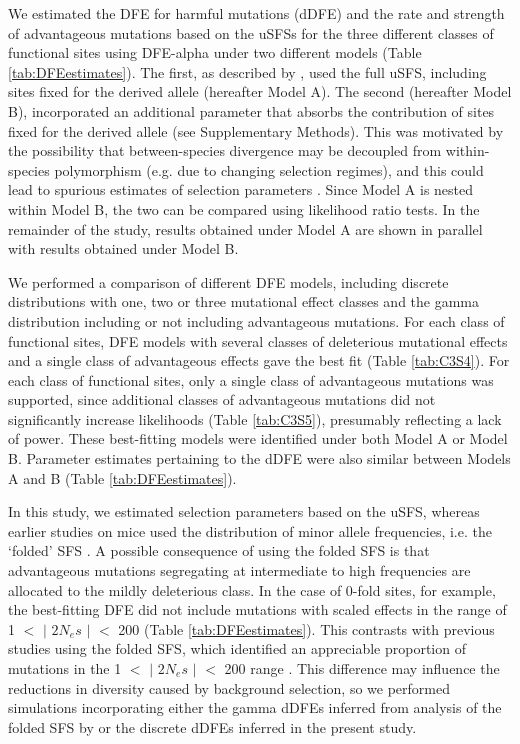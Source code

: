 	We estimated the DFE for harmful mutations (dDFE) and the rate and strength of advantageous mutations based on the uSFSs for the three different classes of functional sites using DFE-alpha under two different models (Table \ref{tab:DFEestimates}). The first, as described by \cite{RN210}, used the full uSFS, including sites fixed for the derived allele (hereafter Model A). The second (hereafter Model B), incorporated an additional parameter that absorbs the contribution of sites fixed for the derived allele (see Supplementary Methods). This was motivated by the possibility that between-species divergence may be decoupled from within-species polymorphism (e.g. due to changing selection regimes), and this could lead to spurious estimates of selection parameters \citep{RN165, RN354}. Since Model A is nested within Model B, the two can be compared using likelihood ratio tests. In the remainder of the study, results obtained under Model A are shown in parallel with results obtained under Model B. 

\linespread{1}

\linespread{2}

	We performed a comparison of different DFE models, including discrete distributions with one, two or three mutational effect classes and the gamma distribution including or not including advantageous mutations. For each class of functional sites, DFE models with several classes of deleterious mutational effects and a single class of advantageous effects gave the best fit (Table \ref{tab:C3S4}). For each class of functional sites, only a single class of advantageous mutations was supported, since additional classes of advantageous mutations did not significantly increase likelihoods (Table \ref{tab:C3S5}), presumably reflecting a lack of power. These best-fitting models were identified under both Model A or Model B. Parameter estimates pertaining to the dDFE were also similar between Models A and B (Table \ref{tab:DFEestimates}). 

	In this study, we estimated selection parameters based on the uSFS, whereas earlier studies on mice used the distribution of minor allele frequencies, i.e. the ‘folded’ SFS \citep{RN158, RN170, RN342, RN122, RN238}. A possible consequence of using the folded SFS is that advantageous mutations segregating at intermediate to high frequencies are allocated to the mildly deleterious class. In the case of 0-fold sites, for example, the best-fitting DFE did not include mutations with scaled effects in the range of 1 $<$ $\mid$ $2N_es$ $\mid$ $<$ 200 (Table \ref{tab:DFEestimates}). This contrasts with previous studies using the folded SFS, which identified an appreciable proportion of mutations in the 1 $<$ $\mid$ $2N_es$ $\mid$ $<$ 200 range \citep{RN122,RN178}. This difference may influence the reductions in diversity caused by background selection, so we performed simulations incorporating either the gamma dDFEs inferred from analysis of the folded SFS by \cite{RN122} or the discrete dDFEs inferred in the present study.
 
